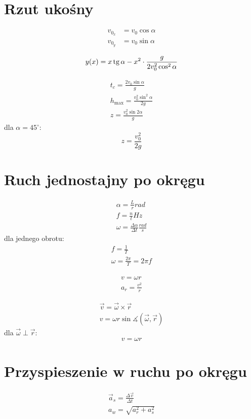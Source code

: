 \section{Rzut ukośny}
\begin{align*}
  v_{0_x} &= v_0 \cos \alpha\\
  v_{0_y} &= v_0 \sin \alpha
\end{align*}

\begin{equation}
  y(x) = x \operatorname{tg} \alpha - x^2 \cdot \frac{g}{2 v_0^2 \cos^2 \alpha}
\end{equation}

\begin{gather*}
  t_c = \frac{2 v_0 \sin \alpha}{g}\\
  h_\text{max} = \frac{v_0^2 \sin^2 \alpha}{2g}\\
  z = \frac{v_0^2 \sin 2\alpha}{g}
\end{gather*}
dla $\alpha = 45^\circ$:
\begin{equation*}
  z = \frac{v_0^2}{2g}
\end{equation*}

\section{Ruch jednostajny po okręgu}

\begin{gather*}
  \alpha = \frac Lr \unit{rad}\\
  f = \frac nt \unit{Hz}\\
  \omega = \frac{\Delta \alpha}{\Delta t} \unit{\frac{rad}{s}}
\end{gather*}
dla jednego obrotu:
\begin{gather*}
  f = \frac 1 T\\
  \omega = \frac{2\pi}{T} = 2\pi f
\end{gather*}

\begin{gather*}
  v = \omega r\\
  a_r = \frac{v^2}{r}
\end{gather*}

\begin{gather*}
  \vec v = \vec \omega \times \vec r\\
  v = \omega r \sin\measuredangle(\vec \omega, \vec r)
\end{gather*}
dla $\vec \omega \perp \vec r$:
\begin{equation*}
  v = \omega r
\end{equation*}

\section{Przyspieszenie w ruchu po okręgu}
\begin{gather*}
  \vec a_s = \frac{\Delta \vec v}{\Delta t}\\[0.5em]
  a_w = \sqrt{a_r^2 + a_s^2}
\end{gather*}

